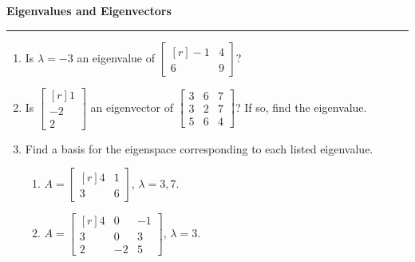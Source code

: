 \documentclass[12pt]{article}
\begin{document}
\begin{center}
{\bf \Large Eigenvalues and Eigenvectors}
\vspace{0.2cm}
\hrule
\end{center}

\begin{multicols*}{2}
	\begin{enumerate}
		\item Is $\lambda = -3$ an eigenvalue of $\begin{bmatrix*}[r]
			-1 & 4\\ 6 & 9
		\end{bmatrix*}$?

		\vfill

		\item Is $\begin{bmatrix*}[r]
			1\\-2\\2
		\end{bmatrix*}$ an eigenvector of $\begin{bmatrix}
			3&6&7\\ 3&2&7\\ 5&6&4
		\end{bmatrix}$? If so, find the eigenvalue.

		\vfill

		\item Find a basis for the eigenspace corresponding to each listed eigenvalue.
		\begin{enumerate}
			\item $A = \begin{bmatrix*}[r]
				4 & 1\\3&6
			\end{bmatrix*}$, $\lambda = 3, 7$.
			\vfill
			\item $A=\begin{bmatrix*}[r]
				4&0&-1\\ 3&0&3\\ 2&-2&5
			\end{bmatrix*}$, $\lambda = 3$.
		\end{enumerate}

		\vfill\null\columnbreak


\end{enumerate}
\end{multicols*}
\end{document}

